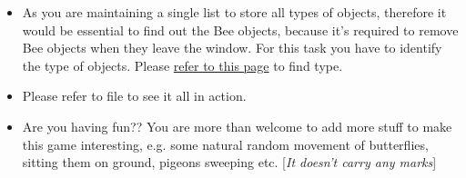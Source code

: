 \documentclass[a4paper,12pt]{article}
\begin{document}
\begin{itemize}
	 	\item As you are maintaining a single list to store all types of objects, therefore it would be essential to find out the Bee objects, because it's required to remove Bee objects when they leave the window. For this task you have to identify the type of objects. Please \href{https://en.cppreference.com/w/cpp/language/typeid}{refer to this page} to find type.
	 	
	 	
	 	\item Please refer to  file to see it all in action.
	 	
	 	
	 	\item Are you having fun?? You are more than welcome to add more stuff to make this game interesting, e.g. some natural random movement of butterflies, sitting them on ground, pigeons sweeping etc. [\textit{It doesn't carry any marks}]
	 \end{itemize}
 


	
	
%	
%	
%	
%	
%	
\end{document}
